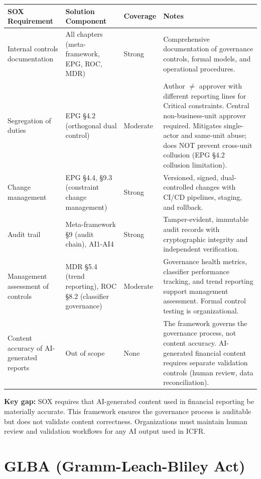 \begin{table}[ht]
  \centering\small
  \begin{tabular}{@{}>{\raggedright\arraybackslash}p{1.55cm}>{\raggedright\arraybackslash}p{2.32cm}>{\raggedright\arraybackslash}p{1.09cm}>{\raggedright\arraybackslash}p{9.05cm}@{}}
  \toprule
  SOX Requirement & Solution Component & Coverage & Notes \\
  \midrule
  Internal controls documentation & All chapters (meta-framework, EPG, ROC, MDR) & Strong & Comprehensive documentation of governance controls, formal models, and operational procedures. \\
  Segregation of duties & EPG \S{}4.2 (orthogonal dual control) & Moderate & Author $\neq$ approver with different reporting lines for Critical constraints. Central non-business-unit approver required. Mitigates single-actor and same-unit abuse; does NOT prevent cross-unit collusion (EPG \S{}4.2 collusion limitation). \\
  Change management & EPG \S{}4.4, \S{}9.3 (constraint change management) & Strong & Versioned, signed, dual-controlled changes with CI/CD pipelines, staging, and rollback. \\
  Audit trail & Meta-framework \S{}9 (audit chain), AI1-AI4 & Strong & Tamper-evident, immutable audit records with cryptographic integrity and independent verification. \\
  Management assessment of controls & MDR \S{}5.4 (trend reporting), ROC \S{}8.2 (classifier governance) & Moderate & Governance health metrics, classifier performance tracking, and trend reporting support management assessment. Formal control testing is organizational. \\
  Content accuracy of AI-generated reports & Out of scope & None & The framework governs the governance process, not content accuracy. AI-generated financial content requires separate validation controls (human review, data reconciliation). \\
  \bottomrule
  \end{tabular}
\end{table}


\textbf{Key gap:} SOX requires that AI-generated content used in financial reporting be materially accurate. This framework ensures the governance process is auditable but does not validate content correctness. Organizations must maintain human review and validation workflows for any AI output used in ICFR.



\section{GLBA (Gramm-Leach-Bliley Act)}
\label{sec:regmap-6}



